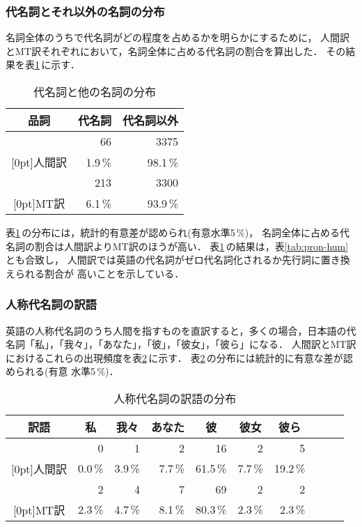 \subsubsection{代名詞とそれ以外の名詞の分布}
\label{sec:result:pron:pron-others}

名詞全体のうちで代名詞がどの程度を占めるかを明らかにするために，
人間訳とMT訳それぞれにおいて，名詞全体に占める代名詞の割合を算出した．
その結果を表\ref{tab:pron-others}\,に示す．
\begin{table}[htbp]
\caption{代名詞と他の名詞の分布}
\label{tab:pron-others}
\begin{center}
\begin{tabular}{|c||r|r|}\hline
品詞 & \multicolumn{1}{c|}{代名詞} & 
\multicolumn{1}{c|}{代名詞以外} \\\hline\hline
&  66 & 3375 \\
\raisebox{1.5ex}[0pt]{人間訳} & 1.9\,\% & 98.1\,\% \\\hline
& 213 & 3300 \\
\raisebox{1.5ex}[0pt]{MT訳} & 6.1\,\% & 93.9\,\% \\\hline
\end{tabular}
\end{center}
\end{table}

表\ref{tab:pron-others}\,の分布には，統計的有意差が認められ(有意水準5\,\%)，
名詞全体に占める代名詞の割合は人間訳よりMT訳のほうが高い． 
表\ref{tab:pron-others}\,の結果は，表\ref{tab:pron-hum}\,とも合致し，
人間訳では英語の代名詞がゼロ代名詞化されるか先行詞に置き換えられる割合が 
高いことを示している．


\subsubsection{人称代名詞の訳語}
\label{sec:result:pron:trans}

英語の人称代名詞のうち人間を指すものを直訳すると，多くの場合，日本語の代
名詞「私」，「我々」，「あなた」，「彼」，「彼女」，「彼ら」になる．
人間訳とMT訳におけるこれらの出現頻度を表\ref{tab:pron-distri}\,に示す．
表\ref{tab:pron-distri}\,の分布には統計的に有意な差が認められる(有意
水準5\,\%)．
\begin{table}[htbp]
\caption{人称代名詞の訳語の分布}
\label{tab:pron-distri}
\begin{center}
\begin{tabular}{|c||r|r|r|r|r|r|r|r|r|}\hline
訳語 & \multicolumn{1}{|c}{私} & \multicolumn{1}{|c}{我々} & \multicolumn{1}{|c}{あなた} & \multicolumn{1}{|c}{彼} & \multicolumn{1}{|c}{彼女} & \multicolumn{1}{|c|}{彼ら} \\\hline\hline
 & 0 & 1 & 2 & 16 & 2 & 5 \\
\raisebox{1.5ex}[0pt]{人間訳} & 0.0\,\% & 3.9\,\% & 7.7\,\% & 61.5\,\% & 7.7\,\% & 19.2\,\% \\\hline
 & 2 & 4 & 7 & 69 & 2 & 2 \\ 
\raisebox{1.5ex}[0pt]{MT訳} & 2.3\,\% & 4.7\,\% & 8.1\,\% & 80.3\,\% & 2.3\,\% & 2.3\,\% \\\hline
\end{tabular}
\end{center}
\end{table}


